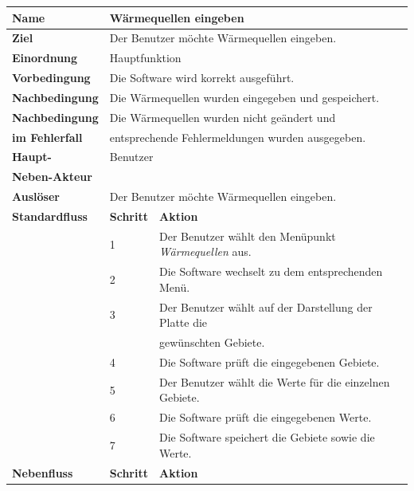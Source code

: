 \begin{table} [H]
	\centering
	\begin{tabular}{|l|l|l|}
		\hline
		\textbf{Name} 			& \multicolumn{2}{|l|}{Wärmequellen eingeben}  \\
		\hline
		\textbf{Ziel} 			& \multicolumn{2}{|l|}{Der Benutzer möchte Wärmequellen eingeben. }\\ 
		\hline
		\textbf{Einordnung}		& \multicolumn{2}{|l|}{Hauptfunktion}\\
		\hline
		\textbf{Vorbedingung}	& \multicolumn{2}{|l|}{Die Software wird korrekt ausgeführt.} \\
		\hline
		\textbf{Nachbedingung}	& \multicolumn{2}{|l|}{Die Wärmequellen wurden eingegeben und gespeichert.}\\
		\hline
		\textbf{Nachbedingung} 	& \multicolumn{2}{|l|}{Die Wärmequellen wurden nicht geändert und}\\
		\textbf{im Fehlerfall}	& \multicolumn{2}{|l|}{entsprechende Fehlermeldungen wurden ausgegeben.}\\
		\hline
		\textbf{Haupt-} 			& \multicolumn{2}{|l|}{Benutzer}\\
		\textbf{Neben-Akteur}	& \multicolumn{2}{|l|}{	}			\\
		\hline
		\textbf{Auslöser} 		& \multicolumn{2}{|l|}{Der Benutzer möchte Wärmequellen eingeben.} \\
		\hline 
		\textbf{Standardfluss} & \textbf{Schritt} & \textbf{Aktion} \\
		\hline
		&	1	& Der Benutzer wählt den Menüpunkt \emph{Wärmequellen} aus. \\
		\cline{2-3}
		&	2	& Die Software wechselt zu dem entsprechenden Menü.\\
		\cline{2-3}
		&	3	& Der Benutzer wählt auf der Darstellung der Platte die \\
		&       & gewünschten Gebiete.\\
		\cline{2-3}
		&	4	& Die Software prüft die eingegebenen Gebiete.\\
		\cline{2-3}
		&	5	& Der Benutzer wählt die Werte für die einzelnen Gebiete.\\
		\cline{2-3}
		&	6	& Die Software prüft die eingegebenen Werte.\\
		\cline{2-3}
		&	7	& Die Software speichert die Gebiete sowie die Werte.\\
		\hline
		\textbf{Nebenfluss} & \textbf{Schritt} & \textbf{Aktion}\\

\end{tabular}
\end{table}
